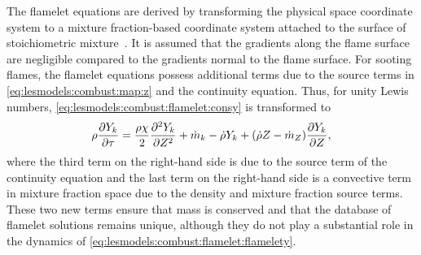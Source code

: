 The flamelet equations are derived by transforming the physical space coordinate system to a mixture fraction-based coordinate system attached to the surface of stoichiometric mixture~\cite{peters1984}. It is assumed that the gradients along the flame surface are negligible compared to the gradients normal to the flame surface. For sooting flames, the flamelet equations possess additional terms due to the source terms in \cref{eq:lesmodels:combust:map:z} and the continuity equation. Thus, for unity Lewis numbers, \cref{eq:lesmodels:combust:flamelet:consy} is transformed to
\begin{equation}\label{eq:lesmodels:combust:flamelet:flamelety}
  \rho\pder[Y_k]{\tau} = \frac{\rho\chi}{2}\sder[Y_k]{Z} + \dot{m}_k - \dot{\rho}Y_k + (\dot{\rho}Z - \dot{m}_Z)\pder[Y_k]{Z},
\end{equation}
where the third term on the right-hand side is due to the source term of the continuity equation and the last term on the right-hand side is a convective term in mixture fraction space due to the density and mixture fraction source terms. These two new terms ensure that mass is conserved and that the database of flamelet solutions remains unique, although they do not play a substantial role in the dynamics of \cref{eq:lesmodels:combust:flamelet:flamelety}.

